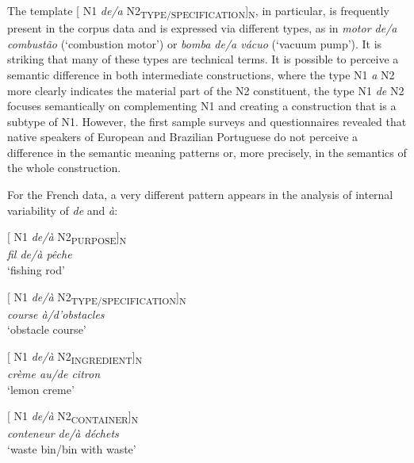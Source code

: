 \documentclass[output=paper]{langsci/langscibook}
\begin{document}
The template [ N1 \textit{de/a} N2\textsubscript{TYPE/SPECIFICATION}]\textsubscript{N}, in particular, is frequently present in the corpus data and is expressed via different types, as in \textit{motor de/a combustão} (`combustion motor') or \textit{bomba de/a vácuo} (`vacuum pump'). It is striking that many of these types are technical terms. It is possible to perceive a semantic difference in both intermediate constructions, where the type N1 \textit{a} N2 more clearly indicates the material part of the N2 constituent, the type N1 \textit{de} N2 focuses semantically on complementing N1 and creating a construction that is a subtype of N1. However, the first sample surveys and questionnaires revealed that native speakers of European and Brazilian Portuguese do not perceive a difference in the semantic meaning patterns or, more precisely, in the semantics of the whole construction.

For the French data, a very different pattern appears in the analysis of internal variability of \textit{de} and \textit{à}: 

\begin{exe}\ex\begin{minipage}[t]{0.4\textwidth}    %
[ N1 \textit{de/à} N2\textsubscript{PURPOSE}]\textsubscript{N}\\
\textit{fil de/à pêche}\\
`fishing rod'
\end{minipage}\hfill            %
\begin{minipage}[t]{0.45\textwidth}
[ N1 \textit{de/à} N2\textsubscript{TYPE/SPECIFICATION}]\textsubscript{N}\\
\textit{course à/d’obstacles}\\
`obstacle course'
\end{minipage}%
\end{exe}

\begin{exe}\ex\begin{minipage}[t]{0.4\textwidth}
[ N1 \textit{de/à} N2\textsubscript{INGREDIENT}]\textsubscript{N}\\
\textit{crème au/de citron}\\
`lemon creme'
\end{minipage}\hfill\begin{minipage}[t]{0.45\textwidth}
[ N1 \textit{de/à} N2\textsubscript{CONTAINER}]\textsubscript{N}\\
\textit{conteneur de/à déchets }\\
`waste bin\slash bin with waste'
\end{minipage}%
\end{exe}
\end{document}
